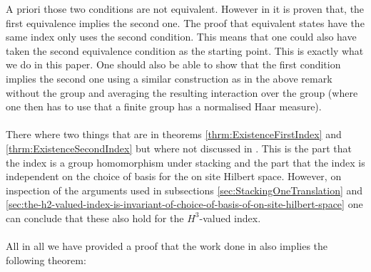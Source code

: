 \documentclass[12pt,a4paper,twoside]{article}
\numberwithin{equation}{section}
\begin{document}
A priori those two conditions are not equivalent. However in \cite{ogata2021h3gmathbb} it is proven that, the first equivalence implies the second one. The proof that equivalent states have the same index only uses the second condition. This means that one could also have taken the second equivalence condition as the starting point. This is exactly what we do in this paper. One should also be able to show that the first condition implies the second one using a similar construction as in the above remark without the group and averaging the resulting interaction over the group (where one then has to use that a finite group has a normalised Haar measure).\\\\
There where two things that are in theorems \ref{thrm:ExistenceFirstIndex} and \ref{thrm:ExistenceSecondIndex} but where not discussed in \cite{ogata2021h3gmathbb}. This is the part that the index is a group homomorphism under stacking and the part that the index is independent on the choice of basis for the on site Hilbert space. However, on inspection of the arguments used in subsections \ref{sec:StackingOneTranslation} and \ref{sec:the-h2-valued-index-is-invariant-of-choice-of-basis-of-on-site-hilbert-space} one can conclude that these also hold for the $H^3$-valued index.\\\\
All in all we have provided a proof that the work done in \cite{ogata2021h3gmathbb} also implies the following theorem:
\end{document}
